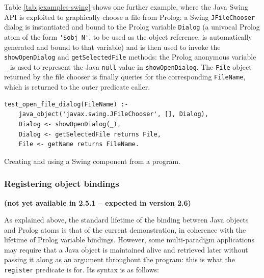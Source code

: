 Table \ref{tab:jexamples-swing} shows one further example, where the Java Swing API is
exploited to graphically choose a file from Prolog: a Swing \texttt{JFileChooser} dialog is instantiated and bound to the Prolog variable \texttt{Dialog} (a univocal Prolog atom of the form \verb|'$obj_N'|, to be used as the object reference, is automatically generated and bound to that variable) and is then used to invoke the \texttt{showOpenDialog} and
\texttt{getSelectedFile} methods: the Prolog anonymous variable \texttt{\_} is used to represent the Java \texttt{null} value in \texttt{showOpenDialog}.
%
The \texttt{File} object returned by the file chooser is finally queries for the corresponding \texttt{FileName}, which is returned to the outer predicate caller.


\begin{table}
\begin{verbatim}
test_open_file_dialog(FileName) :-
    java_object('javax.swing.JFileChooser', [], Dialog),
    Dialog <- showOpenDialog(_),
    Dialog <- getSelectedFile returns File,
    File <- getName returns FileName.
\end{verbatim}
\caption{Creating and using a Swing component from a \tuprolog{} program.}
\label{tab:jexamples-swing}
\end{table}

\color{red}
\subsubsection{Registering object bindings}
\label{sssec:register(prolog)}

\textbf{(not yet available in \tuprolog{} 2.5.1 -- expected in version 2.6)}

As explained above, the standard lifetime of the binding between Java objects and Prolog atoms is that of the current demonstration, in coherence with the lifetime of Prolog variable bindings.
However, some multi-paradigm applications may require that a Java object is maintained alive and retrieved later without passing it along as an argument throughout the program: this is what the \texttt{register} predicate is for.
Its syntax is as follows:\\


